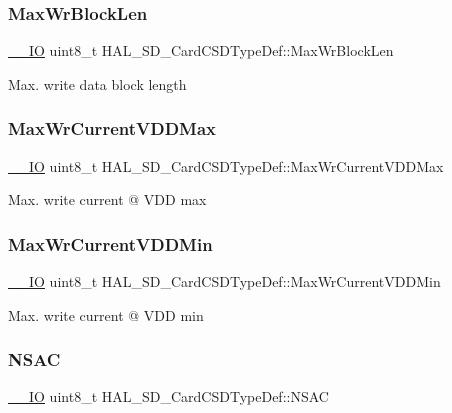 \subsubsection{\texorpdfstring{MaxWrBlockLen}{MaxWrBlockLen}}
{\footnotesize\ttfamily \mbox{\hyperlink{core__sc300_8h_aec43007d9998a0a0e01faede4133d6be}{\+\_\+\+\_\+\+IO}} uint8\+\_\+t H\+A\+L\+\_\+\+S\+D\+\_\+\+Card\+C\+S\+D\+Type\+Def\+::\+Max\+Wr\+Block\+Len}

Max. write data block length \mbox{\label{struct_h_a_l___s_d___card_c_s_d_type_def_a7a2095f100ab56071d4e82560f76b6bf}} 
\subsubsection{\texorpdfstring{MaxWrCurrentVDDMax}{MaxWrCurrentVDDMax}}
{\footnotesize\ttfamily \mbox{\hyperlink{core__sc300_8h_aec43007d9998a0a0e01faede4133d6be}{\+\_\+\+\_\+\+IO}} uint8\+\_\+t H\+A\+L\+\_\+\+S\+D\+\_\+\+Card\+C\+S\+D\+Type\+Def\+::\+Max\+Wr\+Current\+V\+D\+D\+Max}

Max. write current @ V\+DD max \mbox{\label{struct_h_a_l___s_d___card_c_s_d_type_def_a7b8c894e788695fb8c90e9b12757e5fa}} 
\subsubsection{\texorpdfstring{MaxWrCurrentVDDMin}{MaxWrCurrentVDDMin}}
{\footnotesize\ttfamily \mbox{\hyperlink{core__sc300_8h_aec43007d9998a0a0e01faede4133d6be}{\+\_\+\+\_\+\+IO}} uint8\+\_\+t H\+A\+L\+\_\+\+S\+D\+\_\+\+Card\+C\+S\+D\+Type\+Def\+::\+Max\+Wr\+Current\+V\+D\+D\+Min}

Max. write current @ V\+DD min \mbox{\label{struct_h_a_l___s_d___card_c_s_d_type_def_ad1e4e53e354411d6142f69780c243bb8}} 
\subsubsection{\texorpdfstring{NSAC}{NSAC}}
{\footnotesize\ttfamily \mbox{\hyperlink{core__sc300_8h_aec43007d9998a0a0e01faede4133d6be}{\+\_\+\+\_\+\+IO}} uint8\+\_\+t H\+A\+L\+\_\+\+S\+D\+\_\+\+Card\+C\+S\+D\+Type\+Def\+::\+N\+S\+AC}

